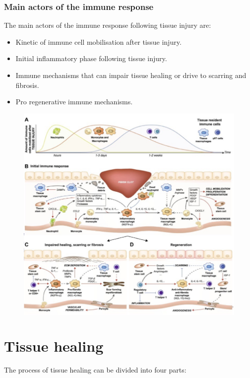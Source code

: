 		\subsubsection{Main actors of the immune response}
		The main actors of the immune response following tissue injury are:

		\begin{multicols}{2}
			\begin{itemize}
				\item Kinetic of immune cell mobilisation after tissue injury.
				\item Initial inflammatory phase following tissue injury.
				\item Immune mechanisms that can impair tissue healing or drive to scarring and fibrosis.
				\item Pro regenerative immune mechanisms.
			\end{itemize}
		\end{multicols}

		\begin{figure}[ht]
			\includegraphics[width=1\textwidth]{healing}
			\caption{\label{fig:healing}}
		\end{figure}

\section{Tissue healing}
The process of tissue healing can be divided into four parts:

